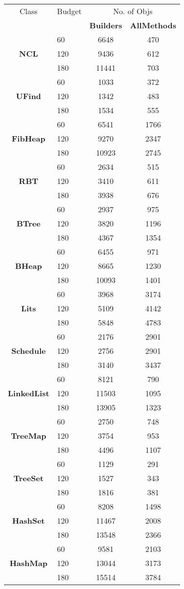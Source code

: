 \begin{table}[H]
\centering
\scriptsize
\begin{tabular}{ c l c c}
\hline
Class & Budget &
\multicolumn{2}{c}{\textsf{No. of Objs}} \\
&& \tiny{\textbf{Builders}} & \tiny{\textbf{AllMethods}} \\
\hline
\multirow{3}{*}{\textbf{NCL}} 
&	60	&	6648	&	470	\\
&	120	&	9436	&	612	\\
&	180	&	11441	&	703	\\
\hline
\multirow{3}{*}{\textbf{UFind}} 
&	60	&	1033	&	372	\\
&	120	&	1342	&	483	\\
&	180	&	1534	&	555	\\
\hline
\multirow{3}{*}{\textbf{FibHeap}}
&	60	&	6541	&	1766	\\
&	120	&	9270	&	2347	\\
&	180	&	10923	&	2745	\\
\hline
\multirow{3}{*}{\textbf{RBT}}
&	60	&	2634	&	515	\\
&	120	&	3410	&	611	\\
&	180	&	3938	&	676	\\
\hline
\multirow{3}{*}{\textbf{BTree}}
&	60	&	2937	&	975	\\
&	120	&	3820	&	1196	\\
&	180	&	4367	&	1354	\\
\hline
\multirow{3}{*}{\textbf{BHeap}}
&	60	&	6455	&	971	\\
&	120	&	8665	&	1230	\\
&	180	&	10093	&	1401	\\
\hline
\multirow{3}{*}{\textbf{Lits}}
&	60	&	3968	&	3174	\\
&	120	&	5109	&	4142	\\
&	180	&	5848	&	4783	\\
\hline
\multirow{3}{*}{\textbf{Schedule}}
&	60	&	2176	&	2901	\\
&	120	&	2756	&	2901	\\
&	180	&	3140	&	3437	\\
\hline
\multirow{3}{*}{\textbf{LinkedList}} 
&	60	&	8121	&	790	\\
&	120	&	11503	&	1095	\\
&	180	&	13905	&	1323	\\
\hline
\multirow{3}{*}{\textbf{TreeMap}} 
&	60	&	2750	&	748	\\
&	120	&	3754	&	953	\\
&	180	&	4496	&	1107	\\
\hline\multirow{3}{*}{\textbf{TreeSet}}
&	60	&	1129	&	291	\\
&	120	&	1527	&	343	\\
&	180	&	1816	&	381	\\
\hline
\multirow{3}{*}{\textbf{HashSet}}
&	60	&	8208	&	1498	\\
&	120	&	11467	&	2008	\\
&	180	&	13548	&	2366	\\
\hline
\multirow{3}{*}{\textbf{HashMap}}
&	60	&	9581	&	2103	\\
&	120	&	13044	&	3173	\\
&	180	&	15514	&	3784	\\
\hline


\end{tabular}
\end{table}
